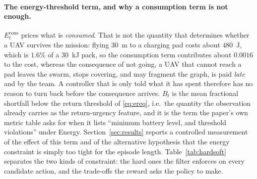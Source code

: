 \documentclass[conference]{IEEEtran}
\begin{document}
\paragraph{The energy-threshold term, and why a consumption term is not
enough.} $E_t^{\mathrm{cons}}$ prices what is \emph{consumed}. That is not
the quantity that determines whether a UAV survives the mission: flying
$30$~m to a charging pad costs about $480$~J, which is $1.6\%$ of a
$30$~kJ pack, so the consumption term contributes about $0.0016$ to the
cost, whereas the consequence of not going, a UAV that cannot reach a
pad leaves the swarm, stops covering, and may fragment the graph, is paid
\emph{late} and by the team. A controller that is only told what it has
spent therefore has no reason to turn back before the consequence arrives.
$B_t$ is the mean fractional shortfall below the return threshold of
\eqref{eq:ereq}, i.e.\ the quantity the observation already carries as the
return-urgency feature, and it is the term the paper's own metric table
asks for when it lists ``minimum battery level, and threshold violations''
under Energy. Section~\ref{sec:results} reports a controlled measurement of
the effect of this term and of the alternative hypothesis that the energy
constraint is simply too tight for the episode length. Table~\ref{tab:hardsoft} separates the two kinds of constraint: the hard ones the filter enforces on every candidate action, and the trade-offs the reward asks the policy to make.
\end{document}
